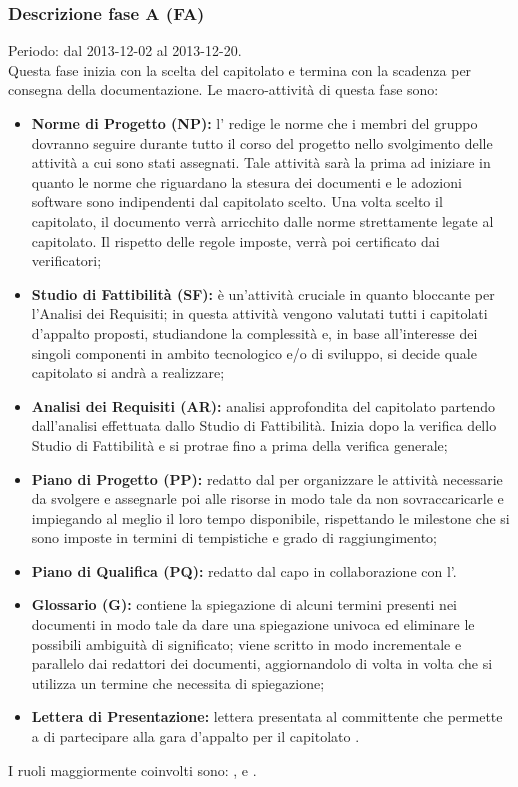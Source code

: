 \subsubsection{Descrizione fase A (FA)}
\label{Analisi(FA)}
Periodo: dal 2013-12-02 al 2013-12-20. \\
Questa fase inizia con la scelta del capitolato e termina con la scadenza per consegna della documentazione.
Le macro-attività di questa fase sono:
\begin{itemize}
\item \textbf{Norme di Progetto (NP):} l'\administrator{} redige le norme che i membri del gruppo \authorName{} dovranno seguire durante tutto il corso del progetto nello svolgimento delle attività a cui sono stati assegnati. Tale attività sarà la prima ad iniziare in quanto le norme che riguardano la stesura dei documenti e le adozioni software sono indipendenti dal capitolato scelto. Una volta scelto il capitolato, il documento verrà arricchito dalle norme strettamente legate al capitolato. Il rispetto delle regole imposte, verrà poi certificato dai verificatori;  
\item \textbf{Studio di Fattibilità (SF):} è un'attività cruciale in quanto bloccante per l'Analisi dei Requisiti; in questa attività vengono valutati tutti i capitolati d'appalto proposti, studiandone la complessità e, in base all'interesse dei singoli componenti in ambito tecnologico e/o di sviluppo, si decide quale capitolato si andrà a realizzare;
\item \textbf{Analisi dei Requisiti (AR):} analisi approfondita del capitolato partendo dall'analisi effettuata dallo Studio di Fattibilità. Inizia dopo la verifica dello Studio di Fattibilità e si protrae fino a prima della verifica generale;
\item \textbf{Piano di Progetto (PP):} redatto dal \projectManager{} per organizzare le attività necessarie da svolgere e assegnarle poi alle risorse in modo tale da non sovraccaricarle e impiegando al meglio il loro tempo disponibile, rispettando le milestone\glossario{} che si sono imposte in termini di tempistiche e grado di raggiungimento;
\item \textbf{Piano di Qualifica (PQ):} redatto dal \verifier{} capo in collaborazione con l'\administrator.
\item \textbf{Glossario (G):} contiene la spiegazione di alcuni termini presenti nei documenti in modo tale da dare una spiegazione univoca ed eliminare le possibili ambiguità di significato; viene scritto in modo incrementale e parallelo dai redattori dei documenti, aggiornandolo di volta in volta che si utilizza un termine che necessita di spiegazione;
\item \textbf{Lettera di Presentazione:} lettera presentata al committente che permette a \authorName{} di partecipare alla gara d'appalto per il capitolato \project . 
\end{itemize} 
I ruoli maggiormente coinvolti sono: \administrator , \analyst{} e \verifier .
\\
